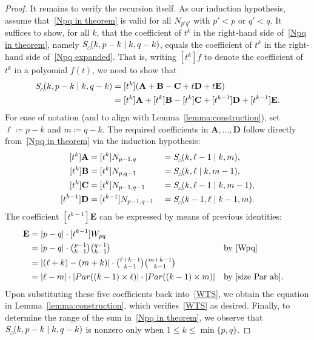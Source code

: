 \documentclass[10pt,a4paper]{amsart}
\newcommand{\Par}{{\rm Par}}
\newcommand{\Stri}{{\rm S}_{_{\!\triangle\!\!}}}
\begin{document}
\begin{proof}
    It remains to verify the recursion itself.
    As our induction hypothesis, assume that~\eqref{Npq in theorem} is valid for all $N_{p'q'}$ with $p' < p$ or $q' < q$.
    It suffices to show, for all $k$, that the coefficient of $t^k$ in the right-hand side of~\eqref{Npq in theorem}, namely $\Stri(k, p-k \mid k, q-k)$, equals the coefficient of $t^k$ in the right-hand side of~\eqref{Npq expanded}.
    That is, writing $[t^k] f$ to denote the coefficient of $t^k$ in a polyomial $f(t)$,
    we need to show that
    \begin{align}
        \Stri(k, p-k \mid k, q-k) &= [t^k](\mathbf{A} + \mathbf{B} - \mathbf{C} + t\mathbf{D} + t\mathbf{E}) \nonumber \\
        &= [t^k]\mathbf{A} + [t^k]\mathbf{B} - [t^k]\mathbf{C} + [t^{k-1}]\mathbf{D} + [t^{k-1}]\mathbf{E}. \label{WTS} 
    \end{align}
    For ease of notation (and to align with Lemma~\ref{lemma:construction}), set $\ell \coloneqq p-k$ and $m \coloneqq q-k$.
    The required coefficients in $\mathbf{A}, \ldots, \mathbf{D}$ follow directly from~\eqref{Npq in theorem} via the induction hypothesis:
    \begin{alignat*}{3}
        [t^k]\mathbf{A} &= [t^k]N_{p-1,q} &&=\Stri(k, \ell-1 \mid k, m),\\
        [t^k]\mathbf{B} &= [t^k]N_{p,q-1} &&= \Stri(k, \ell \mid k, m-1),\\
        [t^k]\mathbf{C} &= [t^k]N_{p-1,q-1} &&= \Stri(k, \ell-1 \mid k, m-1),\\
        [t^{k-1}]\mathbf{D} &= [t^{k-1}]N_{p-1,q-1} &&= \Stri(k-1, \ell \mid k-1, m).
    \end{alignat*}
    The coefficient $[t^{k-1}]\mathbf{E}$ can be expressed by means of previous identities:
    \begin{align*}
        [t^{k-1}]\mathbf{E} &= |p-q| \cdot [t^{k-1}]W_{pq} \\
        &= |p-q| \cdot \textstyle\binom{p-1}{k-1} \binom{q-1}{k-1} && \text{by~\eqref{Wpq}}\\
        &= |(\ell+k) - (m+k)| \cdot \textstyle\binom{\ell + k-1}{k-1} \binom{m + k-1}{k-1}\\
        &= |\ell - m| \cdot |\Par((k-1) \times \ell)| \cdot |\Par((k-1) \times m)| && \text{by~\eqref{size Par ab}}.
    \end{align*}
  Upon substituting these five coefficients back into~\eqref{WTS}, we obtain the equation in Lemma~\ref{lemma:construction}, which verifies~\eqref{WTS} as desired. 
  Finally, to determine the range of the sum in~\eqref{Npq in theorem}, we observe that $\Stri(k, p-k \mid k, q-k)$ is nonzero only when $1 \leq k \leq \min\{p,q\}$.
\end{proof}
\end{document}
